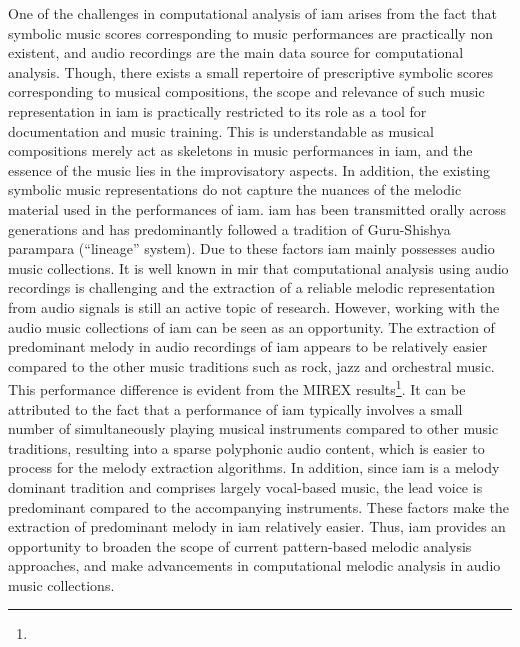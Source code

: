  One of the challenges in computational analysis of \gls{iam} arises from the fact that symbolic music scores corresponding to music performances are practically non existent, and audio recordings are the main data source for computational analysis.  Though, there exists a small repertoire of prescriptive symbolic scores corresponding to musical compositions, the scope and relevance of such music representation in \gls{iam} is practically restricted to its role as a tool for documentation and music training. This is understandable as musical compositions merely act as skeletons in music performances in \gls{iam}, and the essence of the music lies in the improvisatory aspects. In addition, the existing symbolic music representations do not capture the nuances of the melodic material used in the performances of \gls{iam}. \gls{iam} has been transmitted orally across generations and has predominantly followed a tradition of Guru-Shishya parampara (``lineage'' system).  Due to these factors \gls{iam} mainly possesses audio music collections. It is well known in \gls{mir} that computational analysis using audio recordings is challenging and the extraction of a reliable melodic representation from audio signals is still an active topic of research. However, working with the audio music collections of \gls{iam} can be seen as an opportunity.  The extraction of predominant melody in audio recordings of \gls{iam} appears to be relatively easier compared to the other music traditions such as rock, jazz and orchestral music. This performance difference is evident from the MIREX results\footnote{}. It can be attributed to the fact that a performance of \gls{iam} typically involves a small number of simultaneously playing musical instruments compared to other music traditions, resulting into a sparse polyphonic audio content, which is easier to process for the melody extraction algorithms. In addition, since \gls{iam} is a melody dominant tradition and comprises largely vocal-based music, the lead voice is predominant compared to the accompanying instruments. These factors make the extraction of predominant melody in \gls{iam} relatively easier. Thus, \gls{iam} provides an opportunity to broaden the scope of current pattern-based melodic analysis approaches, and make advancements in computational melodic analysis in audio music collections.

